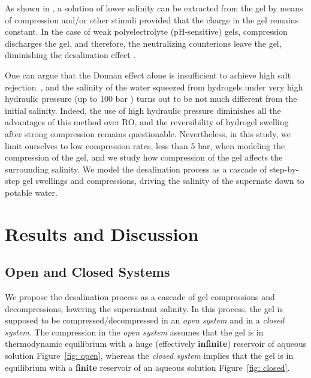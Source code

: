 \documentclass[gels,article,accept,pdftex,moreauthors]{Definitions/mdpi}
\newcommand{\reffig}[1]{Figure~\ref{#1}}
\begin{document}
As shown in \cite{Li2011, Ali2015, Arens_2017, Fengler_2020}, a solution of lower salinity can be extracted from the gel by means of compression and/or other stimuli provided that the charge in the gel remains constant.
In the case of weak polyelectrolyte (pH-sensitive) gels, compression discharges the gel, and therefore, the neutralizing counterions leave the gel, diminishing the desalination effect \cite{Rud2018}.

One can argue that the Donnan effect alone is insufficient to achieve high salt rejection~\cite{Cai2016}, and the salinity of the water squeezed from hydrogels under very high hydraulic pressure (up to 100 bar \cite{Fengler_2020}) turns out to be not much different from the initial salinity.
Indeed, the use of high hydraulic pressure diminishes all the advantages of this method over RO, and the reversibility of hydrogel swelling after strong compression remains questionable.
Nevertheless, in this study, we limit ourselves to low compression rates, less than 5 bar, when modeling the compression of the gel, and we study how compression of the gel affects the surrounding salinity.
We model the desalination process as a cascade of step-by-step gel swellings and compressions, driving the salinity of the supernate down to potable water.

\section{Results and Discussion\label{sec: RD}}


\subsection{Open and Closed Systems}


We propose the desalination process as a cascade of gel compressions and decompressions, lowering the  supernatant salinity.
In this process, the gel is supposed to be compressed/decompressed in an \emph{open system %
} and in a \emph{closed system}.
The compression in the \emph{open system} assumes that the gel is in thermodynamic equilibrium with a huge (effectively \textbf{infinite}) reservoir of aqueous solution \reffig{fig: open}, whereas 
the \emph{closed system} implies that the gel is in equilibrium with a \textbf{finite %
} reservoir of an aqueous solution \reffig{fig: closed}.  
\end{document}

